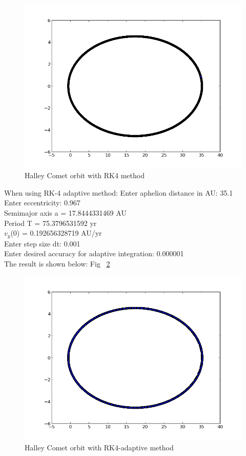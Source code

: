 \documentclass[11pt,letterpaper]{article}
\begin{document}
\begin{figure}
\begin{center}
\includegraphics[width=0.8\linewidth,angle=0]{rk4.png}
\caption{Halley Comet orbit with RK4 method}
\label{figure1}
\end{center}
\end{figure}

When using RK-4 adaptive method:
 Enter aphelion distance in AU: 35.1\\
 Enter eccentricity: 0.967\\
 Semimajor axis a =  17.8444331469  AU\\
 Period T =  75.3796531592  yr\\
 $v_y$(0) =  0.192656328719  AU/yr\\
 Enter step size dt: 0.001\\
 Enter desired accuracy for adaptive integration: 0.000001\\
 The result is shown below: Fig ~\ref{figure2}

\begin{figure}
\begin{center}
\includegraphics[width=0.8\linewidth,angle=0]{rk4ad.png}
\caption{Halley Comet orbit with RK4-adaptive method}
\label{figure2}
\end{center}
\end{figure}
\end{document}
